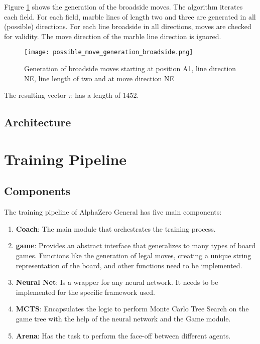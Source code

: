 \begin{enumerate}
          Figure \ref{possible_move_generation_broadside} shows the generation of the broadside moves. The algorithm iterates each field. For each field, marble lines of length two and three are generated in all (possible) directions. For each line broadside in all directions, moves are checked for validity. The move direction of the marble line direction is ignored.

          \begin{figure}
              \centering
              \texttt{[image: possible\_move\_generation\_broadside.png]}
              \caption{Generation of broadside moves starting at position A1, line direction NE, line length of two and at move direction NE}
              \label{possible_move_generation_broadside}
          \end{figure}

          The resulting vector $\pi$ has a length of $1452$.
\end{enumerate}

\subsection{Architecture}
\section{Training Pipeline}
\subsection{Components}
\label{components}

The training pipeline of AlphaZero General has five main components:
\begin{enumerate}
    \item \textbf{Coach}: The main module that orchestrates the training process.
    \item \textbf{game}: Provides an abstract interface that generalizes to many types of board games. Functions like the generation of legal moves, creating a unique string representation of the board, and other functions need to be implemented.
    \item \textbf{Neural Net}: Is a wrapper for any neural network. It needs to be implemented for the specific framework used.
    \item \textbf{MCTS}: Encapsulates the logic to perform Monte Carlo Tree Search on the game tree with the help of the neural network and the Game module.
    \item \textbf{Arena}: Has the task to perform the face-off between different agents.
\end{enumerate}

